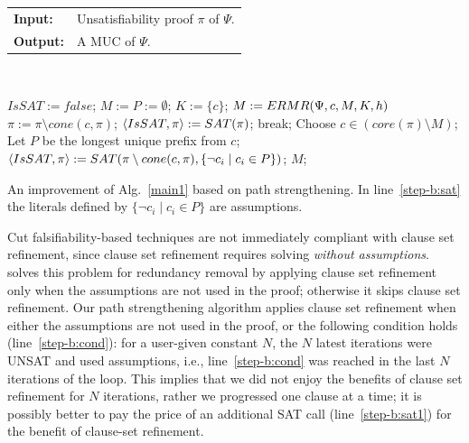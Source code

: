 \documentclass[twoside,11pt]{article}
\newcommand\muser{\tool{MUSer2}\xspace}
\renewcommand\Pr{\pi}
\begin{document}
\begin{algorithm}[ht]
\begin{tabular}{lp{8.5 cm}}
{\bf Input:}  & Unsatisfiability proof $\Pr$ of $\Psi$.\\
{\bf Output:} & A MUC of $\Psi$. \\
\end{tabular} \\
\vspace {0.3 cm}
\begin{algorithmic}[1]
\State $IsSAT := false$;
\State $M := P := \emptyset$;
\State \label{step-K5}$K := \{c\}$;
\State \label{step-call5}$M := {\sc ERMR} (\Psi, c, M, K, h)$ 
\Else
{}  
\State $\Pr := \Pr \setminus  cone(c,\Pr)$;
  
\State \label{step-b:sat1} $\langle IsSAT,\Pr\rangle := \alg{SAT}(\Pr)$; 
\EndIf
\EndIf
\EndIf
\If {$core(\Pr) = M$} break; \EndIf
\State Choose $c \in (core(\Pr) \setminus M)$;
\State Let $P$ be the longest unique prefix from $c$;
\State \label{step-b:sat}$\langle IsSAT,\Pr\rangle :=  \alg{SAT}(\Pr \setminus cone(c,\Pr), \{\lnot c_i \mid c_i \in P\})$; 
\EndWhile
\State \Return $M$;

\end{algorithmic}
\caption{An improvement of Alg.~\ref{main1} based on path strengthening. In
line~\ref{step-b:sat} the literals defined by $\{\lnot c_i \mid c_i \in P\}$
are assumptions.} \label{main2}
\end{algorithm}


Cut falsifiability-based techniques are not immediately compliant with clause
set refinement, since clause set refinement requires solving \emph{without
assumptions}.
\muser solves this problem for redundancy removal by applying clause set
refinement only when the assumptions are not used in the proof; otherwise it
skips clause set refinement. Our path strengthening algorithm applies clause
set refinement when either the assumptions are not used in the proof, or the following condition holds (line~\ref{step-b:cond}): for a user-given constant $N$, the $N$ latest iterations
were UNSAT and used assumptions, i.e., line~\ref{step-b:cond} was reached in the last $N$ iterations of the loop. This implies that we did not enjoy the benefits of clause set refinement for $N$ iterations, rather we progressed one clause at a time; it is possibly better to pay the price of an additional SAT call (line~\ref{step-b:sat1}) for the benefit of clause-set refinement.
\end{document}
